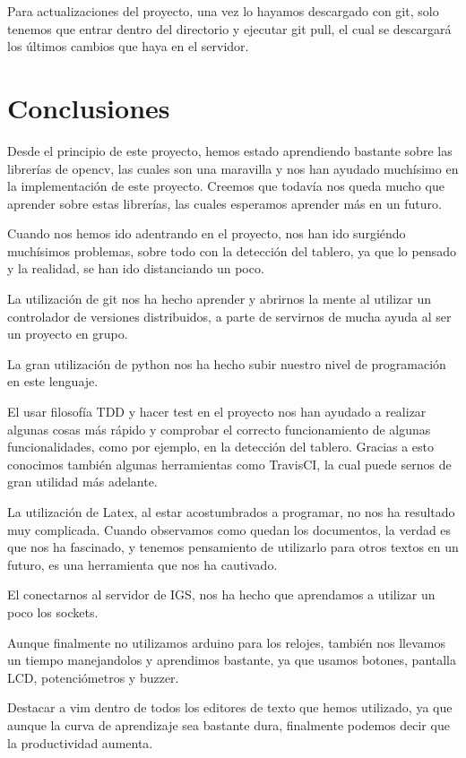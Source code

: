 \documentclass[12pt,a4paper]{report}
\begin{document}
Para actualizaciones del proyecto, una vez lo hayamos descargado con git, solo
tenemos que entrar dentro del directorio y ejecutar git pull, el cual se
descargará los últimos cambios que haya en el servidor. 


\chapter{Conclusiones}

Desde el principio de este proyecto, hemos estado aprendiendo bastante sobre las
librerías de opencv, las cuales son una maravilla y nos han ayudado muchísimo en
la implementación de este proyecto. Creemos que todavía nos queda mucho que
aprender sobre estas librerías, las cuales esperamos aprender más en un futuro. 

Cuando nos hemos ido adentrando en el proyecto, nos han ido surgiéndo muchísimos
problemas, sobre todo con la detección del tablero, ya que lo pensado y la
realidad, se han ido distanciando un poco. 

La utilización de git nos ha hecho aprender y abrirnos la mente al utilizar un
controlador de versiones distribuidos, a parte de servirnos de mucha ayuda al
ser un proyecto en grupo. 

La gran utilización de python nos ha hecho subir nuestro nivel de programación
en este lenguaje.

El usar filosofía TDD y hacer test en el proyecto nos han ayudado a realizar
algunas cosas más rápido y comprobar el correcto funcionamiento de algunas
funcionalidades, como por ejemplo, en la detección del tablero. Gracias a esto
conocimos también algunas herramientas como TravisCI, la cual puede sernos de
gran utilidad más adelante. 

La utilización de Latex, al estar acostumbrados a programar, no nos ha resultado
muy complicada. Cuando observamos como quedan los documentos, la verdad es que
nos ha fascinado, y tenemos pensamiento de utilizarlo para otros textos en un
futuro, es una herramienta que nos ha cautivado.

El conectarnos al servidor de IGS, nos ha hecho que aprendamos a utilizar un
poco los sockets.

Aunque finalmente no utilizamos arduino para los relojes, también nos llevamos
un tiempo manejandolos y aprendimos bastante, ya que usamos botones, pantalla
LCD, potenciómetros y buzzer.

Destacar a vim dentro de todos los editores de texto que hemos utilizado, ya que
aunque la curva de aprendizaje sea bastante dura, finalmente podemos decir que
la productividad aumenta. 
\end{document}
